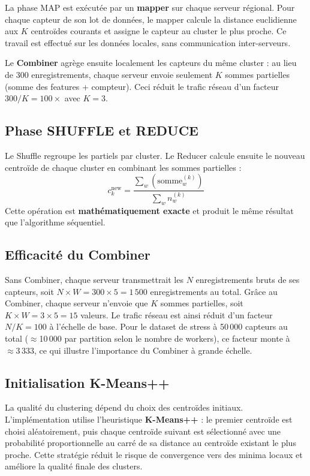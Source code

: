 \documentclass[12pt,a4paper]{article}
\begin{document}
La phase MAP est exécutée par un \textbf{mapper} sur chaque serveur régional.
Pour chaque capteur de son lot de données, le mapper calcule la distance
euclidienne aux $K$ centroïdes courants et assigne le capteur au cluster le plus proche.
Ce travail est effectué sur les données locales, sans communication inter-serveurs.

Le \textbf{Combiner} agrège ensuite localement les capteurs du même cluster :
au lieu de 300 enregistrements, chaque serveur envoie seulement $K$ sommes partielles
(somme des features + compteur). Ceci réduit le trafic réseau
d'un facteur $300/K = 100\times$ avec $K=3$.

\subsection{Phase SHUFFLE et REDUCE}

Le Shuffle regroupe les partiels par cluster. Le Reducer calcule ensuite le nouveau
centroïde de chaque cluster en combinant les sommes partielles :
\[
  c_k^{\text{new}} = \frac{\sum_w (\text{somme}_{w}^{(k)})}{\sum_w n_w^{(k)}}
\]
Cette opération est \textbf{mathématiquement exacte} et produit le même résultat que
l'algorithme séquentiel.

\subsection{Efficacité du Combiner}

Sans Combiner, chaque serveur transmettrait les $N$ enregistrements bruts de ses
capteurs, soit $N \times W = 300 \times 5 = 1\,500$ enregistrements au total.
Grâce au Combiner, chaque serveur n'envoie que $K$ sommes partielles, soit
$K \times W = 3 \times 5 = 15$ valeurs. Le trafic réseau est ainsi réduit d'un
facteur $N/K = 100$ à l'échelle de base. Pour le dataset de stress à 50\,000
capteurs au total ($\approx$10\,000 par partition selon le nombre de workers), ce facteur monte à $\approx 3\,333$, ce qui
illustre l'importance du Combiner à grande échelle.

\subsection{Initialisation K-Means++}

La qualité du clustering dépend du choix des centroïdes initiaux. L'implémentation
utilise l'heuristique \textbf{K-Means++} : le premier centroïde est choisi
aléatoirement, puis chaque centroïde suivant est sélectionné avec une probabilité
proportionnelle au carré de sa distance au centroïde existant le plus proche.
Cette stratégie réduit le risque de convergence vers des minima locaux et améliore
la qualité finale des clusters.
\end{document}
